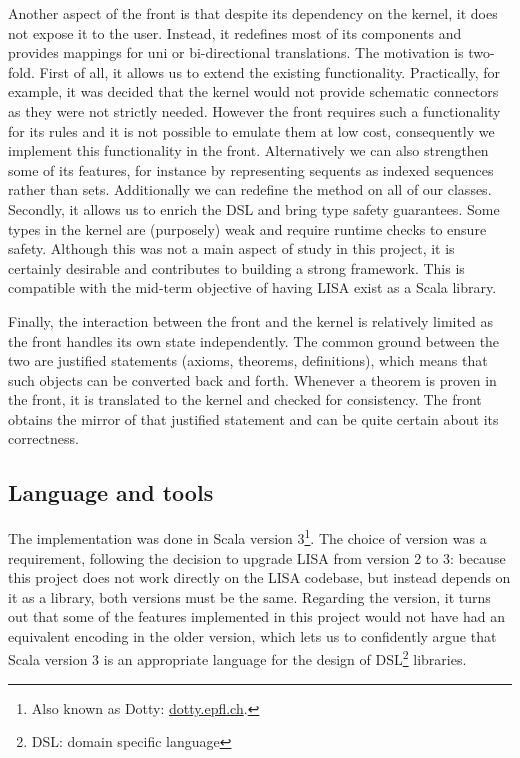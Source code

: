 Another aspect of the front is that despite its dependency on the kernel, it does not expose it to the user. Instead, it redefines most of its components and provides mappings for uni or bi-directional translations. The motivation is two-fold. First of all, it allows us to extend the existing functionality. Practically, for example, it was decided that the kernel would not provide schematic connectors as they were not strictly needed. However the front requires such a functionality for its rules and it is not possible to emulate them at low cost, consequently we implement this functionality in the front. Alternatively we can also strengthen some of its features, for instance by representing sequents as indexed sequences rather than sets. Additionally we can redefine the method  on all of our classes. Secondly, it allows us to enrich the DSL and bring type safety guarantees. Some types in the kernel are (purposely) weak and require runtime checks to ensure safety. Although this was not a main aspect of study in this project, it is certainly desirable and contributes to building a strong framework. This is compatible with the mid-term objective of having LISA exist as a Scala library.

Finally, the interaction between the front and the kernel is relatively limited as the front handles its own state independently. The common ground between the two are justified statements (axioms, theorems, definitions), which means that such objects can be converted back and forth. Whenever a theorem is proven in the front, it is translated to the kernel and checked for consistency. The front obtains the mirror of that justified statement and can be quite certain about its correctness.

\subsection{Language and tools}

The implementation was done in Scala version 3\footnote{Also known as Dotty: \href{https://dotty.epfl.ch}{dotty.epfl.ch}.}. The choice of version was a requirement, following the decision to upgrade LISA from version 2 to 3: because this project does not work directly on the LISA codebase, but instead depends on it as a library, both versions must be the same. Regarding the version, it turns out that some of the features implemented in this project would not have had an equivalent encoding in the older version, which lets us to confidently argue that Scala version 3 is an appropriate language for the design of DSL\footnote{DSL: domain specific language} libraries.

